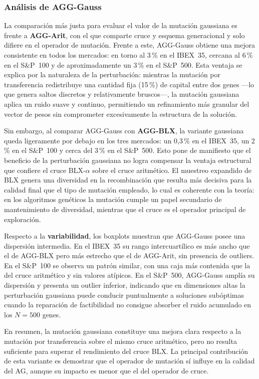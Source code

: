 \subsubsection{Análisis de AGG-Gauss}

La comparación más justa para evaluar el valor de la mutación gaussiana es frente a \textbf{AGG-Arit}, con el que comparte cruce y esquema generacional y solo difiere en el operador de mutación. Frente a este, AGG-Gauss obtiene una mejora consistente en todos los mercados: en torno al 3\,\% en el IBEX~35, cercana al 6\,\% en el S\&P~100 y de aproximadamente un 3\,\% en el S\&P~500. Esta ventaja se explica por la naturaleza de la perturbación: mientras la mutación por transferencia redistribuye una cantidad fija (15\,\%) de capital entre dos genes ---lo que genera saltos discretos y relativamente bruscos---, la mutación gaussiana aplica un ruido suave y continuo, permitiendo un refinamiento más granular del vector de pesos sin comprometer excesivamente la estructura de la solución.

Sin embargo, al comparar AGG-Gauss con \textbf{AGG-BLX}, la variante gaussiana queda ligeramente por debajo en los tres mercados: un 0,3\,\% en el IBEX~35, un 2\,\% en el S\&P~100 y cerca del 3\,\% en el S\&P~500. Esto pone de manifiesto que el beneficio de la perturbación gaussiana no logra compensar la ventaja estructural que confiere el cruce BLX-$\alpha$ sobre el cruce aritmético. El muestreo expandido de BLX genera una diversidad en la recombinación que resulta más decisiva para la calidad final que el tipo de mutación empleado, lo cual es coherente con la teoría: en los algoritmos genéticos la mutación cumple un papel secundario de mantenimiento de diversidad, mientras que el cruce es el operador principal de exploración.

Respecto a la \textbf{variabilidad}, los boxplots muestran que AGG-Gauss posee una dispersión intermedia. En el IBEX~35 su rango intercuartílico es más ancho que el de AGG-BLX pero más estrecho que el de AGG-Arit, sin presencia de outliers. En el S\&P~100 se observa un patrón similar, con una caja más contenida que la del cruce aritmético y sin valores atípicos. En el S\&P~500, AGG-Gauss amplía su dispersión y presenta un outlier inferior, indicando que en dimensiones altas la perturbación gaussiana puede conducir puntualmente a soluciones subóptimas cuando la reparación de factibilidad no consigue absorber el ruido acumulado en los $N=500$ genes.

En resumen, la mutación gaussiana constituye una mejora clara respecto a la mutación por transferencia sobre el mismo cruce aritmético, pero no resulta suficiente para superar el rendimiento del cruce BLX. La principal contribución de esta variante es demostrar que el operador de mutación sí influye en la calidad del AG, aunque su impacto es menor que el del operador de cruce.

